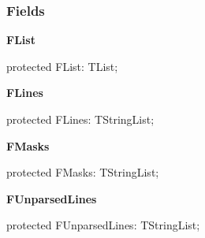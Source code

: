 \documentclass{report}
\newif\ifpdf
\begin{document}
\subsubsection*{\large{\textbf{Fields}}\normalsize\hspace{1ex}\hfill}
\begin{list}{}{
\setlength{\itemindent}{0cm}
\setlength{\listparindent}{0cm}
\setlength{\leftmargin}{\evensidemargin}
\addtolength{\leftmargin}{\tmplength}
\settowidth{\labelsep}{X}
\addtolength{\leftmargin}{\labelsep}
\setlength{\labelwidth}{\tmplength}
}
\label{ftpsend.TFTPList-FList}
\item[\textbf{FList}\hfill]
\ifpdf
\begin{flushleft}
\fi
\begin{ttfamily}
protected FList: TList;\end{ttfamily}

\ifpdf
\end{flushleft}
\fi


\par  \label{ftpsend.TFTPList-FLines}
\item[\textbf{FLines}\hfill]
\ifpdf
\begin{flushleft}
\fi
\begin{ttfamily}
protected FLines: TStringList;\end{ttfamily}

\ifpdf
\end{flushleft}
\fi


\par  \label{ftpsend.TFTPList-FMasks}
\item[\textbf{FMasks}\hfill]
\ifpdf
\begin{flushleft}
\fi
\begin{ttfamily}
protected FMasks: TStringList;\end{ttfamily}

\ifpdf
\end{flushleft}
\fi


\par  \label{ftpsend.TFTPList-FUnparsedLines}
\item[\textbf{FUnparsedLines}\hfill]
\ifpdf
\begin{flushleft}
\fi
\begin{ttfamily}
protected FUnparsedLines: TStringList;\end{ttfamily}

\ifpdf
\end{flushleft}
\fi



\end{list}
\end{document}
